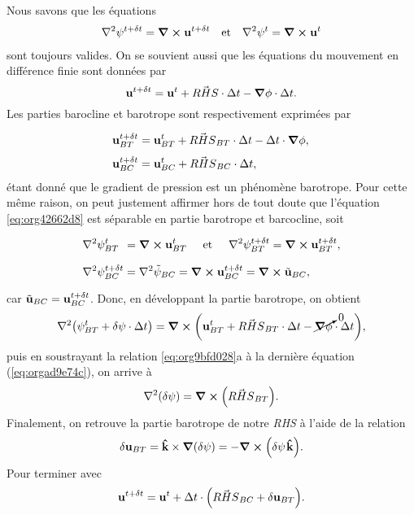 \documentclass[10pt]{article}
\numberwithin{equation}{section}
\newcommand{\kvf}{\vb{\hat{k}}}
\newcommand{\uu}{\vb{u}}
\newcommand{\grande}{\vphantom{\frac{1}{xx}}}
\newcommand{\pt}{\hspace{1pt}} %
\begin{document}
Nous savons que les équations
\begin{align}
\label{eq:org42662d8}
   &&\laplacian{\psi^{t+\delta t}} = \curl{\uu^{t+\delta t}}
   &&\text{et}
   &&\laplacian{\psi^{t}} = \curl{\uu^{t}}&&
\end{align}
sont toujours valides. 
On se souvient aussi que les équations du mouvement en différence finie sont données par 
\begin{equation}
   \uu^{t+\delta t} =
   \uu^t + \vec{RHS}\cdot \Delta t
   - \gradient{\phi}\cdot \Delta t.
\end{equation}
Les parties barocline et barotrope sont respectivement exprimées par
\begin{subequations}
\begin{align}
   &\uu_{BT}^{t+\delta t} = \uu_{BT}^{t} + \vec{RHS}_{BT}\cdot \Delta t - \Delta t\cdot \gradient{\phi},\grande\\
   &\uu_{BC}^{t+\delta t} = \uu_{BC}^{t} + \vec{RHS}_{BC}\cdot \Delta t,
\end{align}
\end{subequations}
étant donné que le gradient de pression est un phénomène barotrope.
Pour cette même raison, on peut justement affirmer hors de tout doute que l'équation \ref{eq:org42662d8} est séparable en partie barotrope et barcocline, soit
\begin{subequations}
\label{eq:org9bfd028}
\begin{align}
   &\grande\laplacian{\psi_{BT}^{t}}\ \pt = \curl{\uu_{BT}^{t}}
   \hspace{0.5cm}\text{et}\hspace{0.5cm}
   \laplacian{\psi_{BT}^{t+\delta t}} = \curl{\uu_{BT}^{t+\delta t}},\\
   &\grande\laplacian{\psi_{BC}^{t+\delta t}} = \laplacian{\tilde{\psi}_{BC}} = \curl{\uu_{BC}^{t+\delta t}} = \curl{\tilde{\uu}_{BC}},
\end{align}
\end{subequations}
car \(\tilde{\uu}_{BC} = \uu^{t+\delta t}_{BC}\).
Donc, en développant la partie barotrope, on obtient
\begin{equation}
\label{eq:orgad9e74c}
   \laplacian(\psi_{BT}^t+\delta \psi \cdot \Delta t) = \curl(\uu^t_{BT} + \vec{RHS}_{BT}\cdot\Delta t - \cancelto{0}{\gradient{\phi}}\cdot \Delta t),
\end{equation}
puis en soustrayant la relation \ref{eq:org9bfd028}a à la dernière équation (\ref{eq:orgad9e74c}), on arrive à
\begin{equation}
   \laplacian(\delta \psi) = \curl(\vec{RHS}_{BT}).
\end{equation}
Finalement, on retrouve la partie barotrope de notre \emph{RHS} à l'aide de la relation
\begin{equation}
   \delta \uu_{BT} = \kvf\times\gradient(\delta \psi) = -\curl(\delta\psi\pt\kvf).
\end{equation}
Pour terminer avec
\begin{equation}
   \uu^{t+\delta t} =
   \uu^t + \Delta t\cdot\qty(\vec{RHS}_{BC}
   + \delta \uu_{BT}).
\end{equation}
\end{document}
